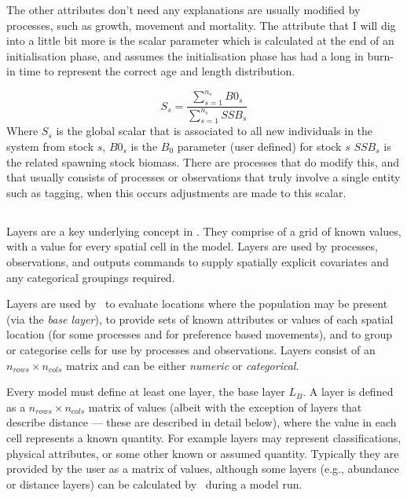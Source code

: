 The other attributes don't need any explanations are usually modified by processes, such as growth, movement and mortality. The attribute that I will dig into a little bit more is the scalar parameter which is calculated at the end of an initialisation phase, and assumes the initialisation phase has had a long in burn-in time to represent the correct age and length distribution.

\begin{equation}
	S_s = \frac{\sum_{s = 1}^{n_s}B0_s}{\sum_{s = 1}^{n_s}SSB_s}
\end{equation}
Where $S_s$ is the global scalar that is associated to all new individuals in the system from stock $s$, $B0_s$ is the $B_0$ parameter (user defined) for stock $s$ $SSB_s$ is the related spawning stock biomass. There are processes that do modify this, and that usually consists of processes or observations that truly involve a single entity such as tagging, when this occurs adjustments are made to this scalar.

\subsection{\label{sec:layers}}
Layers are a key underlying concept in \IBM. They comprise of a grid of known values, with a value for every spatial cell in the model. Layers are used by processes, observations, and outputs commands to supply spatially explicit covariates and any categorical groupings required. 

Layers are used by \IBM\ to evaluate locations where the population may be present (via the \emph{base layer}), to provide sets of known attributes or values of each spatial location (for some processes and for preference based movements), and to group or categorise cells for use by processes and observations. Layers consist of an $n_{rows} \times n_{cols}$ matrix and can be either \emph{numeric} or \emph{categorical}. 

Every model must define at least one layer, the base layer $L_B$. A layer is defined as a $n_{rows} \times n_{cols}$ matrix of values (albeit with the exception of layers that describe distance --- these are described in detail below), where the value in each cell represents a known quantity. For example layers may represent classifications, physical attributes, or some other known or assumed quantity. Typically they are provided by the user as a matrix of values, although some layers (e.g., abundance or distance layers) can be calculated by \IBM\ during a model run. 

